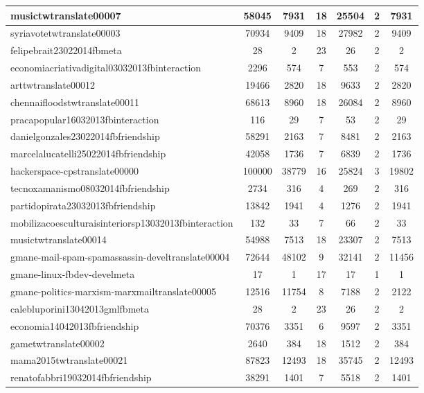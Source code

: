 \begin{table*}[h!]
\begin{center}
\begin{tabular}{| l | c | c | c | c | c | c |}
musictwtranslate00007 & 58045  & 7931  & 18  & 25504  & 2  & 7931 \\\hline
syriavotetwtranslate00003 & 70934  & 9409  & 18  & 27982  & 2  & 9409 \\\hline
felipebrait23022014fbmeta & 28  & 2  & 23  & 26  & 2  & 2 \\\hline
economiacriativadigital03032013fbinteraction & 2296  & 574  & 7  & 553  & 2  & 574 \\\hline
arttwtranslate00012 & 19466  & 2820  & 18  & 9633  & 2  & 2820 \\\hline
chennaifloodstwtranslate00011 & 68613  & 8960  & 18  & 26084  & 2  & 8960 \\\hline
pracapopular16032013fbinteraction & 116  & 29  & 7  & 53  & 2  & 29 \\\hline
danielgonzales23022014fbfriendship & 58291  & 2163  & 7  & 8481  & 2  & 2163 \\\hline
marcelalucatelli25022014fbfriendship & 42058  & 1736  & 7  & 6839  & 2  & 1736 \\\hline
hackerspace-cpstranslate00000 & 100000  & 38779  & 16  & 25824  & 3  & 19802 \\\hline
tecnoxamanismo08032014fbfriendship & 2734  & 316  & 4  & 269  & 2  & 316 \\\hline
partidopirata23032013fbfriendship & 13842  & 1941  & 4  & 1276  & 2  & 1941 \\\hline
mobilizacoesculturaisinteriorsp13032013fbinteraction & 132  & 33  & 7  & 66  & 2  & 33 \\\hline
musictwtranslate00014 & 54988  & 7513  & 18  & 23307  & 2  & 7513 \\\hline
gmane-mail-spam-spamassassin-develtranslate00004 & 72644  & 48102  & 9  & 32141  & 2  & 11456 \\\hline
gmane-linux-fbdev-develmeta & 17  & 1  & 17  & 17  & 1  & 1 \\\hline
gmane-politics-marxism-marxmailtranslate00005 & 12516  & 11754  & 8  & 7188  & 2  & 2122 \\\hline
calebluporini13042013gmlfbmeta & 28  & 2  & 23  & 26  & 2  & 2 \\\hline
economia14042013fbfriendship & 70376  & 3351  & 6  & 9597  & 2  & 3351 \\\hline
gametwtranslate00002 & 2640  & 384  & 18  & 1512  & 2  & 384 \\\hline
mama2015twtranslate00021 & 87823  & 12493  & 18  & 35745  & 2  & 12493 \\\hline
renatofabbri19032014fbfriendship & 38291  & 1401  & 7  & 5518  & 2  & 1401 \\\hline

\end{tabular}
\end{center}
\end{table*}
